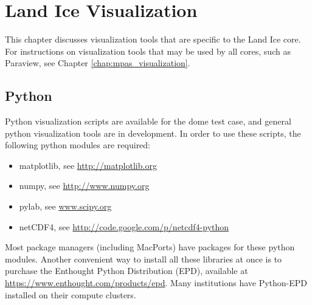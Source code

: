 \chapter{Land Ice Visualization}
\label{chap:landice_visualization}

This chapter discusses visualization tools that are specific to the Land Ice core.  For instructions on visualization tools that may be used by all cores, such as Paraview, see Chapter \ref{chap:mpas_visualization}.

\section{Python}
\label{sec:landice_python}

Python visualization scripts are available for the dome test case, and general python visualization tools are in development.  In order to use these scripts, the following python modules are required:
\begin{itemize}
\item matplotlib, see \url{http://matplotlib.org}
\item numpy, see \url{http://www.numpy.org}
\item pylab, see \url{www.scipy.org}
\item netCDF4, see \url{http://code.google.com/p/netcdf4-python}
\end{itemize}
Most package managers (including MacPorts) have packages for these python modules. 
Another convenient way to install all these libraries at once is to purchase the Enthought Python Distribution (EPD), available at \url{https://www.enthought.com/products/epd}.  
Many institutions have Python-EPD installed on their compute clusters.

